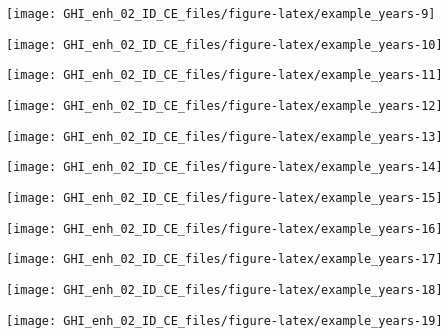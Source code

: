 \documentclass[
  10pt,
  a4paper,oneside]{article}
\begin{document}
\begin{center}\texttt{[image: GHI\_enh\_02\_ID\_CE\_files/figure-latex/example\_years-9]} \end{center}

\begin{center}\texttt{[image: GHI\_enh\_02\_ID\_CE\_files/figure-latex/example\_years-10]} \end{center}

\begin{center}\texttt{[image: GHI\_enh\_02\_ID\_CE\_files/figure-latex/example\_years-11]} \end{center}

\begin{center}\texttt{[image: GHI\_enh\_02\_ID\_CE\_files/figure-latex/example\_years-12]} \end{center}

\begin{center}\texttt{[image: GHI\_enh\_02\_ID\_CE\_files/figure-latex/example\_years-13]} \end{center}

\begin{center}\texttt{[image: GHI\_enh\_02\_ID\_CE\_files/figure-latex/example\_years-14]} \end{center}

\begin{center}\texttt{[image: GHI\_enh\_02\_ID\_CE\_files/figure-latex/example\_years-15]} \end{center}

\begin{center}\texttt{[image: GHI\_enh\_02\_ID\_CE\_files/figure-latex/example\_years-16]} \end{center}

\begin{center}\texttt{[image: GHI\_enh\_02\_ID\_CE\_files/figure-latex/example\_years-17]} \end{center}

\begin{center}\texttt{[image: GHI\_enh\_02\_ID\_CE\_files/figure-latex/example\_years-18]} \end{center}

\begin{center}\texttt{[image: GHI\_enh\_02\_ID\_CE\_files/figure-latex/example\_years-19]} \end{center}
\end{document}
